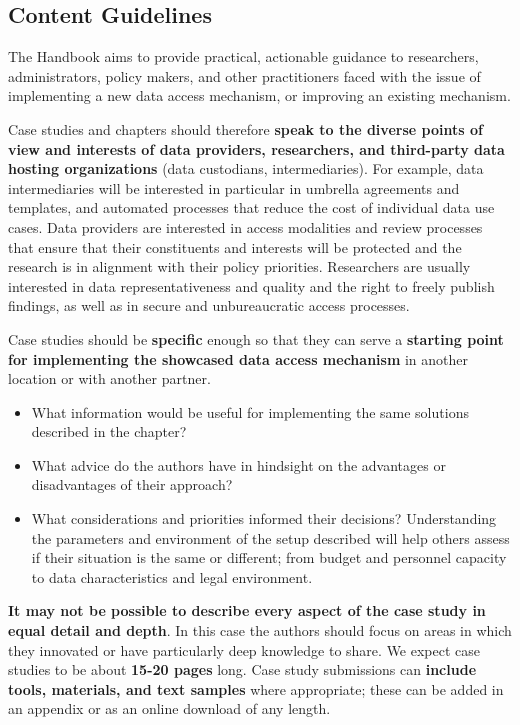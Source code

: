 \documentclass[
]{book}
\providecommand{\tightlist}{%
  \setlength{\itemsep}{0pt}\setlength{\parskip}{0pt}}
\begin{document}
\hypertarget{content-guidelines}{%
\subsection*{Content Guidelines}\label{content-guidelines}}

The Handbook aims to provide practical, actionable guidance to researchers, administrators, policy makers, and other practitioners faced with the issue of implementing a new data access mechanism, or improving an existing mechanism.

Case studies and chapters should therefore \textbf{speak to the diverse points of view and interests of data providers, researchers, and third-party data hosting organizations} (data custodians, intermediaries). For example, data intermediaries will be interested in particular in umbrella agreements and templates, and automated processes that reduce the cost of individual data use cases. Data providers are interested in access modalities and review processes that ensure that their constituents and interests will be protected and the research is in alignment with their policy priorities. Researchers are usually interested in data representativeness and quality and the right to freely publish findings, as well as in secure and unbureaucratic access processes.

Case studies should be \textbf{specific} enough so that they can serve a \textbf{starting point for implementing the showcased data access mechanism} in another location or with another partner.

\begin{itemize}
\tightlist
\item
  What information would be useful for implementing the same solutions described in the chapter?
\item
  What advice do the authors have in hindsight on the advantages or disadvantages of their approach?
\item
  What considerations and priorities informed their decisions? Understanding the parameters and environment of the setup described will help others assess if their situation is the same or different; from budget and personnel capacity to data characteristics and legal environment.
\end{itemize}

\textbf{It may not be possible to describe every aspect of the case study in equal detail and depth}. In this case the authors should focus on areas in which they innovated or have particularly deep knowledge to share. We expect case studies to be about \textbf{15-20 pages} long. Case study submissions can \textbf{include tools, materials, and text samples} where appropriate; these can be added in an appendix or as an online download of any length.
\end{document}
